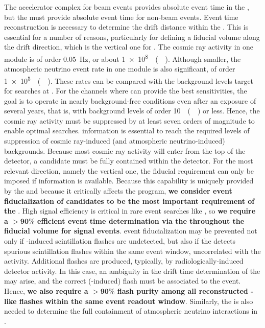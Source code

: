 The accelerator complex for beam events provides absolute event time in the \dune {}, but the  must provide absolute event time for non-beam events. Event time reconstruction is necessary to determine the drift distance within the . This is essential for a number of reasons, particularly for defining a fiducial volume along the  drift direction, which is the vertical one for . The cosmic ray activity in one  module is of order \SI{0.05}{\Hz}, or about \SI{1e8}{\per(\Mtyr)}. Although smaller, the atmospheric neutrino event rate in one  module is also significant, of order \SI{1e5}{\per(\Mtyr)}. These rates can be compared with the background levels target for  searches at \dune. For the  channels where \dune can provide the best sensitivities, the goal is to operate in nearly background-free conditions even after an exposure of several years, that is, with background levels of order \SI{10}{\per(\Mtyr)} or less. Hence, the cosmic ray activity must be suppressed by at least seven orders of magnitude to enable optimal  searches.  information is essential to reach the required levels of suppression of cosmic ray-induced (and atmospheric neutrino-induced) backgrounds. Because most cosmic ray activity will enter from the top of the detector, a  candidate must be fully contained within the detector. For the most relevant direction, namely the vertical one, the fiducial requirement can only be imposed if  information is available. Because this capability is uniquely provided by the  and because it critically affects the  program, {\bf we consider event fiducialization of  candidates to be the most important requirement of the }. High signal efficiency is critical in rare event searches like , so {\bf we require a $\boldsymbol{>90\%}$ efficient event time determination via the  throughout the  fiducial volume for  signal events}.  event fiducialization may be prevented not only if -induced  scintillation flashes are undetected, but also if the  detects spurious  scintillation flashes within the same event window, uncorrelated with the  activity. Additional flashes are produced, typically, by radiologically-induced detector activity. In this case, an ambiguity in the drift time determination of the  may arise, and the correct (-induced) flash must be associated to the event. Hence, {\bf we also require a $\boldsymbol{>90\%}$  flash purity among all reconstructed -like flashes within the same  event readout window}. Similarly, the  is also needed to determine the full containment of atmospheric neutrino interactions in \dune.
 
